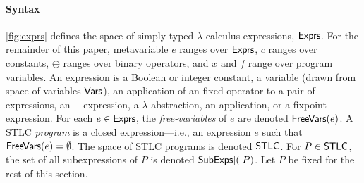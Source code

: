 \paragraph{Syntax} \autoref{fig:exprs} defines the space of
simply-typed $\lambda$-calculus expressions, $\mathsf{Exprs}$.
%
For the remainder of this paper, metavariable $e$ ranges over
$\mathsf{Exprs}$, %
$c$ ranges over constants, %
$\oplus$ ranges over binary operators, and $x$ and $f$ range over
program variables.
%
An expression is a Boolean or integer constant, %
a variable (drawn from space of variables $\mathsf{Vars}$), %
an application of an fixed operator to a pair of expressions, %
an -- expression, %
a $\lambda$-abstraction, %
an application, or %
a fixpoint expression.
%
For each $e \in \mathsf{Exprs}$, the \emph{free-variables} of $e$ are denoted
$\mathsf{FreeVars}(e)$.
%
A STLC \emph{program} is a closed expression---i.e., an expression $e$
such that $\mathsf{FreeVars}(e) = \emptyset$.
%
The space of STLC programs is denoted $\mathsf{STLC}$.
%
For $P \in \mathsf{STLC}$, the set of all subexpressions of $P$ is denoted
$\mathsf{SubExps}[ ( ]P)$.
%
Let $P$ be fixed for the rest of this section.

